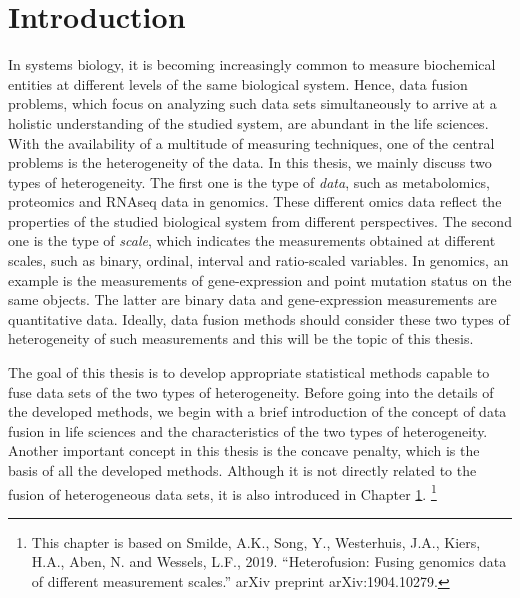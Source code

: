 \chapter{Introduction} \label{chapter:1}
In systems biology, it is becoming increasingly common to measure biochemical entities at different levels of the same biological system. Hence, data fusion problems, which focus on analyzing such data sets simultaneously to arrive at a holistic understanding of the studied system, are abundant in the life sciences. With the availability of a multitude of measuring techniques, one of the central problems is the heterogeneity of the data. In this thesis, we mainly discuss two types of heterogeneity. The first one is the type of \emph{data}, such as metabolomics, proteomics and RNAseq data in genomics. These different omics data reflect the properties of the studied biological system from different perspectives. The second one is the type of \emph{scale}, which indicates the measurements obtained at different scales, such as binary, ordinal, interval and ratio-scaled variables. In genomics, an example is the measurements of gene-expression and point mutation status on the same objects. The latter are binary data and gene-expression measurements are quantitative data. Ideally, data fusion methods should consider these two types of heterogeneity of such measurements and this will be the topic of this thesis.

The goal of this thesis is to develop appropriate statistical methods capable to fuse data sets of the two types of heterogeneity. Before going into the details of the developed methods, we begin with a brief introduction of the concept of data fusion in life sciences and the characteristics of the two types of heterogeneity. Another important concept in this thesis is the concave penalty, which is the basis of all the developed methods. Although it is not directly related to the fusion of heterogeneous data sets, it is also introduced in Chapter \ref{chapter:1}. \footnote{This chapter is based on Smilde, A.K., Song, Y., Westerhuis, J.A., Kiers, H.A., Aben, N. and Wessels, L.F., 2019. ``Heterofusion: Fusing genomics data of different measurement scales.'' arXiv preprint arXiv:1904.10279.}

